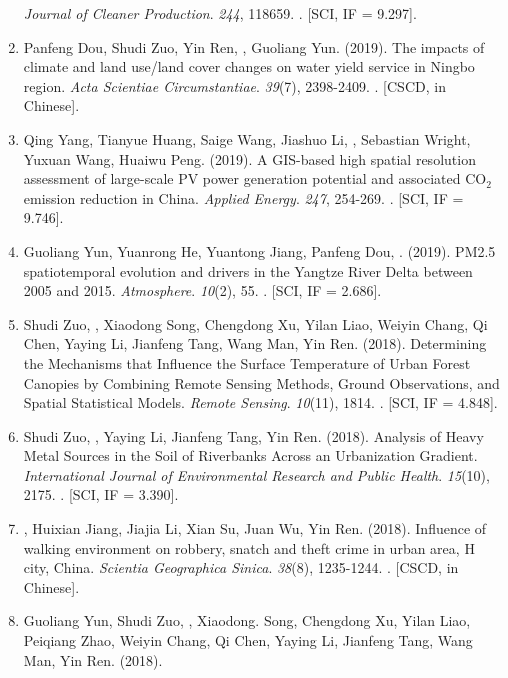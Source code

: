 \begin{enumerate}
    \textit{Journal of Cleaner Production}. \textit{244}, 118659.
    . [SCI, IF = 9.297].
\item
    Panfeng Dou, Shudi Zuo, Yin Ren, \Shaoqing, Guoliang Yun. (2019).
    The impacts of climate and land use/land cover changes on water yield service in Ningbo region.
    \textit{Acta Scientiae Circumstantiae}. \textit{39}(7), 2398-2409.
    . [CSCD, in Chinese].
\item
    Qing Yang, Tianyue Huang, Saige Wang, Jiashuo Li, \Shaoqing, Sebastian Wright, Yuxuan Wang, Huaiwu Peng. (2019).
    A GIS-based high spatial resolution assessment of large-scale PV power generation potential and associated CO$_2$ emission reduction in China.
    \textit{Applied Energy}. \textit{247}, 254-269.
    . [SCI, IF = 9.746].
\item
    Guoliang Yun, Yuanrong He, Yuantong Jiang, Panfeng Dou, \Shaoqing. (2019).
    PM2.5 spatiotemporal evolution and drivers in the Yangtze River Delta between 2005 and 2015.
    \textit{Atmosphere}. \textit{10}(2), 55.
    . [SCI, IF = 2.686].
\item
    Shudi Zuo, \Shaoqing, Xiaodong Song, Chengdong Xu, Yilan Liao, Weiyin Chang, Qi Chen, Yaying Li, Jianfeng Tang, Wang Man, Yin Ren. (2018).
    Determining the Mechanisms that Influence the Surface Temperature of Urban Forest Canopies by Combining Remote Sensing Methods, Ground Observations, and Spatial Statistical Models. 
    \textit{Remote Sensing}. \textit{10}(11), 1814.
    . [SCI, IF = 4.848].
\item
    Shudi Zuo, \Shaoqing, Yaying Li, Jianfeng Tang, Yin Ren. (2018).
	Analysis of Heavy Metal Sources in the Soil of Riverbanks Across an Urbanization Gradient.
    \textit{International Journal of Environmental Research and Public Health}. \textit{15}(10), 2175.
    . [SCI, IF = 3.390].
\item
    \Shaoqing, Huixian Jiang, Jiajia Li, Xian Su, Juan Wu, Yin Ren. (2018).
	Influence of walking environment on robbery, snatch and theft crime in urban area, H city, China.
    \textit{Scientia Geographica Sinica}.  \textit{38}(8), 1235-1244.
    . [CSCD, in Chinese].
\item
    Guoliang Yun, Shudi Zuo, \Shaoqing, Xiaodong. Song, Chengdong Xu, Yilan Liao, Peiqiang Zhao, Weiyin Chang, Qi Chen, Yaying Li, Jianfeng Tang, Wang Man, Yin Ren. (2018).

\end{enumerate}
